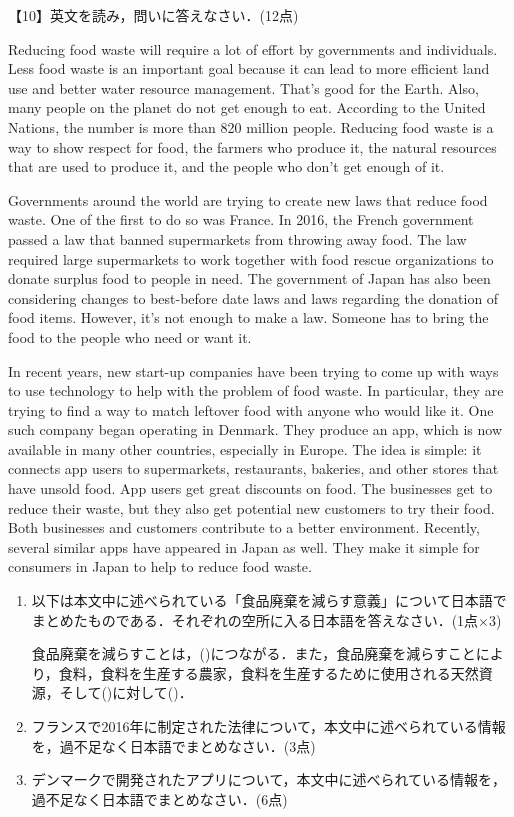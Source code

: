 \newpage
\noindent 【10】英文を読み，問いに答えなさい．(12点)\par\qquad
Reducing food waste will require a lot of effort by governments and individuals.
Less food waste is an important goal because it can lead to more efficient land use and better water resource management.
That's good for the Earth.
Also, many people on the planet do not get enough to eat.
According to the United Nations, the number is more than 820 million people.
Reducing food waste is a way to show respect for food, the farmers who produce it, the natural resources that are used to produce it, and the people who don't get enough of it.\par\qquad
Governments around the world are trying to create new laws that reduce food waste.
One of the first to do so was France.
In 2016, the French government passed a law that banned supermarkets from throwing away food.
The law required large supermarkets to work together with food rescue organizations to donate surplus food to people in need.
The government of Japan has also been considering changes to best-before date laws and laws regarding the donation of food items.
However, it's not enough to make a law.
Someone has to bring the food to the people who need or want it.\par\qquad
In recent years, new start-up companies have been trying to come up with ways to use technology to help with the problem of food waste.
In particular, they are trying to find a way to match leftover food with anyone who would like it.
One such company began operating in Denmark.
They produce an app, which is now available in many other countries, especially in Europe.
The idea is simple: it connects app users to supermarkets, restaurants, bakeries, and other stores that have unsold food.
App users get great discounts on food. The businesses get to reduce their waste, but they also get potential new customers to try their food.
Both businesses and customers contribute to a better environment.
Recently, several similar apps have appeared in Japan as well.
They make it simple for consumers in Japan to help to reduce food waste.
\bigskip
\begin{enumerate}
  \item 以下は本文中に述べられている「食品廃棄を減らす意義」について日本語でまとめたものである．それぞれの空所に入る日本語を答えなさい．(1点$\times$3)
  \par 食品廃棄を減らすことは，()につながる．また，食品廃棄を減らすことにより，食料，食料を生産する農家，食料を生産するために使用される天然資源，そして()に対して()．\bigskip
  \item フランスで2016年に制定された法律について，本文中に述べられている情報を，過不足なく日本語でまとめなさい．(3点)\vspace{1.8cm}
  \item デンマークで開発されたアプリについて，本文中に述べられている情報を，過不足なく日本語でまとめなさい．(6点)
\end{enumerate}